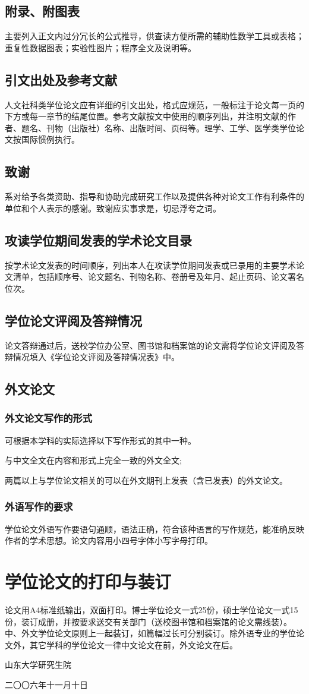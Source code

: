 \subsection{附录、附图表}
主要列入正文内过分冗长的公式推导，供查读方便所需的辅助性数学工具或表格；重复性数据图表；实验性图片；程序全文及说明等。
\subsection{引文出处及参考文献}
人文社科类学位论文应有详细的引文出处，格式应规范，一般标注于论文每一页的下方或每一章节的结尾位置。参考文献按文中使用的顺序列出，并注明文献的作者、题名、刊物（出版社）名称、出版时间、页码等。理学、工学、医学类学位论文按国际惯例执行。
\subsection{致谢}
系对给予各类资助、指导和协助完成研究工作以及提供各种对论文工作有利条件的单位和个人表示的感谢。致谢应实事求是，切忌浮夸之词。
\subsection{攻读学位期间发表的学术论文目录}
按学术论文发表的时间顺序，列出本人在攻读学位期间发表或已录用的主要学术论文清单，包括顺序号、论文题名、刊物名称、卷册号及年月、起止页码、论文署名位次。
\subsection{学位论文评阅及答辩情况}
论文答辩通过后，送校学位办公室、图书馆和档案馆的论文需将学位论文评阅及答辩情况填入《学位论文评阅及答辩情况表》中。
\subsection{外文论文}
\subsubsection{外文论文写作的形式}
可根据本学科的实际选择以下写作形式的其中一种。
\begin{compactenum}
\item 与中文全文在内容和形式上完全一致的外文全文;
\item 两篇以上与学位论文相关的可以在外文期刊上发表（含已发表）的外文论文。
\end{compactenum}
\subsubsection{外语写作的要求}
学位论文外语写作要语句通顺，语法正确，符合该种语言的写作规范，能准确反映作者的学术思想。论文内容用小四号字体小写字母打印。
\section{学位论文的打印与装订}
论文用A4标准纸输出，双面打印。博士学位论文一式25份，硕士学位论文一式15份，装订成册，并按要求送交有关部门（送校图书馆和档案馆的论文需线装）。中、外文学位论文原则上一起装订，如篇幅过长可分别装订。除外语专业的学位论文外，其它学科的学位论文一律中文论文在前，外文论文在后。
\vfill
\hfill\begin{minipage}{.3\textwidth}
山东大学研究生院

二〇〇六年十一月十日
\end{minipage}